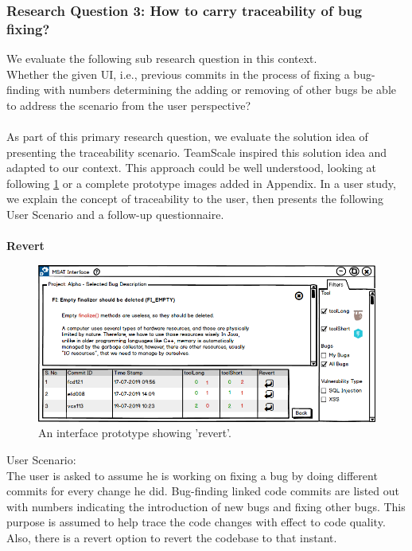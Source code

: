 \subsubsection{Research Question 3: How to carry traceability of bug fixing?}

We evaluate the following sub research question in this context. \\

Whether the given UI, i.e., previous commits in the process of fixing a bug-finding with numbers determining the adding or removing of other bugs be able to address the scenario from the user perspective? \\ \\

As part of this primary research question, we evaluate the solution idea of presenting the traceability scenario. TeamScale inspired this solution idea and adapted to our context. This approach could be well understood, looking at following \ref{fig:S13_revert} or a complete prototype images added in Appendix. In a user study, we explain the concept of traceability to the user, then presents the following User Scenario and a follow-up questionnaire. \\ \\


\textbf{Revert}
\begin{figure}[hbt!]
	\centering
	\includegraphics[width=\linewidth]{figures/solution_ideas_snaps/S13_revert}
	\caption{An interface prototype showing 'revert'.}
	\label{fig:S13_revert}
\end{figure}


User Scenario: \\

The user is asked to assume he is working on fixing a bug by doing different commits for every change he did. Bug-finding linked code commits are listed out with numbers indicating the introduction of new bugs and fixing other bugs. This purpose is assumed to help trace the code changes with effect to code quality. Also, there is a revert option to revert the codebase to that instant. \\ \\

